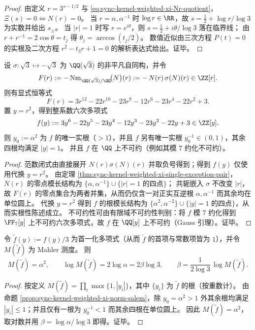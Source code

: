 \begin{proof}
由定义 \(r=3^{s-1/2}\) 与 \eqref{eq:sync-kernel-weighted-xi-Nr-quotient}，\(\Xi(s)=0\iff N(r)=0\)。
当 \(r=\alpha,\alpha^{-1}\) 时 \(\log r\in\RR\)，故 \(s=\frac12+\log r/\log 3\) 为实数并给出 \(s_\pm\)。
当 \(|r|=1\) 时写 \(r=e^{i\theta}\)，则 \(s=\frac12+i\theta/\log 3\) 落在临界线；
由 \(r+r^{-1}=2\cos\theta=t_j\) 得 \(\theta_j=\arccos(t_j/2)\)。
数值近似由三次方程 \(P(t)=0\) 的实根及二次方程 \(r^2-t_3r+1=0\) 的解析表达式给出。证毕。
\end{proof}

\begin{proposition}\label{prop:sync-kernel-weighted-xi-norm-salem}
设 \(\sigma:\sqrt3\mapsto-\sqrt3\) 为 \(\QQ(\sqrt3)\) 的非平凡自同构，并令
\[
F(r):=-\,\mathrm{Nm}_{\QQ(\sqrt3)/\QQ}\!\bigl(N\bigr)(r):=-\,N(r)\,\sigma(N)(r)\in\ZZ[r].
\]
则有显式恒等式
\[
F(r)=3r^{12}-22r^{10}-23r^{8}-12r^{6}-23r^{4}-22r^{2}+3.
\]
置 \(y=r^2\)，得到整系数六次多项式
\[
f(y):=3y^{6}-22y^{5}-23y^{4}-12y^{3}-23y^{2}-22y+3\in\ZZ[y].
\]
则 \(y_0:=\alpha^2\) 为 \(f\) 的唯一实根（\(>1\)），并且 \(f\) 另有唯一实根 \(y_0^{-1}\in(0,1)\)，其余四根均满足 \(|y|=1\)。
并且 \(f\) 在 \(\QQ\) 上不可约（例如其模 \(7\) 约化不可约）。
\end{proposition}

\begin{proof}
范数闭式由直接展开 \(N(r)\sigma(N)(r)\) 并取负号得到；得到 \(f(y)\) 仅使用代换 \(y=r^2\)。
由定理 \ref{thm:sync-kernel-weighted-xi-single-exception-pair}，\(N(r)\) 的零点模长结构为 \(\{\alpha,\alpha^{-1}\}\cup\{|r|=1\text{ 的四点}\}\)；
共轭嵌入 \(\sigma\) 不改变 \(|r|\)，故 \(F(r)\) 的零点集合为两者并集，从而仍仅含一对正实互逆根 \(\alpha,\alpha^{-1}\) 而其余均在单位圆上。
代换 \(y=r^2\) 得到 \(f\) 的根模长结构为 \(\{\alpha^2,\alpha^{-2}\}\cup\{|y|=1\text{ 的四点}\}\)，从而实根性陈述成立。
不可约性可由有限域不可约性判别：将 \(f\) 模 \(7\) 约化得到 \(\FF_7[y]\) 上不可约六次多项式，故 \(f\) 在 \(\QQ[y]\) 上不可约（Gauss 引理）。证毕。
\end{proof}

\begin{theorem}\label{thm:sync-kernel-weighted-xi-beta-mahler}
令 \(\tilde f(y):=f(y)/3\) 为首一化多项式（从而 \(\tilde f\) 的首项与常数项皆为 \(1\)），并令 \(M(\tilde f)\) 为 Mahler 测度。
则
\[
M(\tilde f)=\alpha^2,
\qquad
\log M(\tilde f)=2\log\alpha=2\beta\log 3,
\qquad
\beta=\frac{1}{2\log 3}\,\log M(\tilde f).
\]
\end{theorem}

\begin{proof}
按定义 \(M(\tilde f)=\prod_i\max\{1,|y_i|\}\)，其中 \(\{y_i\}\) 为 \(\tilde f\) 的根（按重数计）。
由命题 \ref{prop:sync-kernel-weighted-xi-norm-salem}，除 \(y_0=\alpha^2>1\) 外其余根均满足 \(|y_i|\le 1\)；并且仅有一根为 \(y_0^{-1}<1\) 而其余四根在单位圆上。
因此 \(M(\tilde f)=\alpha^2\)，取对数并用 \(\beta=\log\alpha/\log 3\) 即得。证毕。
\end{proof}
